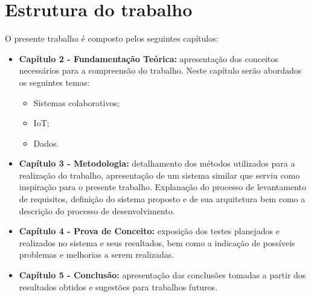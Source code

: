 \section{Estrutura do trabalho}
O presente trabalho é composto pelos seguintes capítulos:
\begin{itemize}
  \item \textbf{Capítulo 2 - Fundamentação Teórica:} apresentação dos conceitos necessários para a compreensão do
  trabalho. Neste capítulo serão abordados os seguintes temas:
  \begin{itemize}
    \item Sistemas colaborativos;
    \item \acrlong{IoT};
    \item Dados.
  \end{itemize}
  \item \textbf{Capítulo 3 - Metodologia:} detalhamento dos métodos utilizados para a realização do trabalho,
  apresentação de um sistema similar que serviu como inspiração para o presente trabalho.
  Explanação do processo de levantamento de requisitos, definição do sistema proposto e de sua arquitetura
  bem como a descrição do processo de desenvolvimento.
  \item \textbf{Capítulo 4 - Prova de Conceito:} exposição dos testes planejados e realizados no sistema e seus resultados, bem como a indicação de possíveis problemas e melhorias a serem realizadas.
  \item \textbf{Capítulo 5 - Conclusão:} apresentação das conclusões tomadas a partir dos resultados obtidos e
  sugestões para trabalhos futuros.
\end{itemize}
